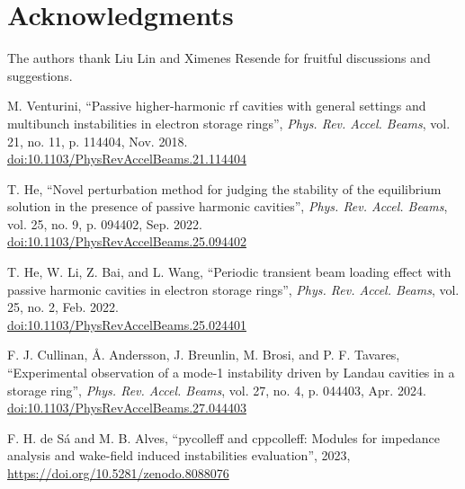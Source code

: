 \documentclass[a4paper,
               ]{jacow}
\begin{document}
\section{Acknowledgments}
The authors thank Liu Lin and Ximenes Resende for fruitful discussions and suggestions.
%
%
%
	{\printbibliography}%
	{%

	\begin{thebibliography}{9} %

	M. Venturini, \textquotedblleft{Passive higher-harmonic rf cavities with general settings and multibunch instabilities in electron storage rings}\textquotedblright, \textit{Phys. Rev. Accel. Beams}, vol. 21, no. 11, p. 114404, Nov. 2018.\\ \url{doi:10.1103/PhysRevAccelBeams.21.114404}
	
    T. He, \textquotedblleft{Novel perturbation method for judging the stability of the equilibrium solution in the presence of passive harmonic cavities}\textquotedblright, \textit{Phys. Rev. Accel. Beams}, vol. 25, no. 9, p. 094402, Sep. 2022.\\ \url{doi:10.1103/PhysRevAccelBeams.25.094402}

	T. He, W. Li, Z. Bai, and L. Wang, \textquotedblleft{Periodic transient beam loading effect with passive harmonic cavities in electron storage rings}\textquotedblright, \textit{Phys. Rev. Accel. Beams}, vol. 25, no. 2, Feb. 2022.\\ \url{doi:10.1103/PhysRevAccelBeams.25.024401}
	
	F. J. Cullinan, \AA{}. Andersson, J. Breunlin, M. Brosi, and P. F. Tavares, \textquotedblleft{Experimental observation of a mode-1 instability driven by Landau cavities in a storage ring}\textquotedblright, \textit{Phys. Rev. Accel. Beams}, vol. 27, no. 4, p. 044403, Apr. 2024.\\ \url{doi:10.1103/PhysRevAccelBeams.27.044403}

    F. H. de Sá and M. B. Alves,
    ``pycolleff and cppcolleff: Modules for impedance analysis and wake-field induced instabilities evaluation'', 2023,\\
    \url{https://doi.org/10.5281/zenodo.8088076}


\end{thebibliography}}
\end{document}
